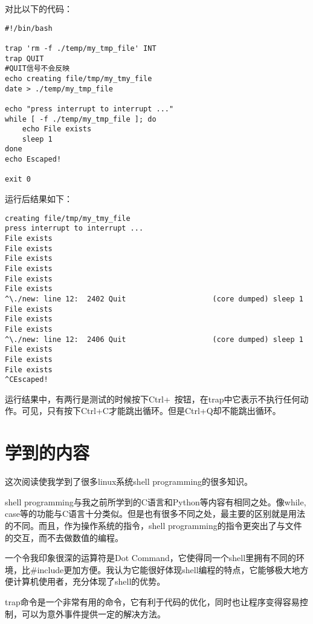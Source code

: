 \documentclass{ctexart}
\begin{document}
对比以下的代码：
\begin{verbatim}
#!/bin/bash

trap 'rm -f ./temp/my_tmp_file' INT
trap QUIT
#QUIT信号不会反映
echo creating file/tmp/my_tmy_file
date > ./temp/my_tmp_file

echo "press interrupt to interrupt ..."
while [ -f ./temp/my_tmp_file ]; do
    echo File exists
    sleep 1
done
echo Escaped!

exit 0
\end{verbatim}
运行后结果如下：
\begin{verbatim}
creating file/tmp/my_tmy_file
press interrupt to interrupt ...
File exists
File exists
File exists
File exists
File exists
File exists
^\./new: line 12:  2402 Quit                    (core dumped) sleep 1
File exists
File exists
File exists
^\./new: line 12:  2406 Quit                    (core dumped) sleep 1
File exists
File exists
File exists
^CEscaped!
\end{verbatim}
运行结果中，有两行是测试的时候按下Ctrl+\ 按钮，在trap中它表示不执行任何动作。可见，只有按下Ctrl+C才能跳出循环。但是Ctrl+Q却不能跳出循环。

\section{学到的内容}
这次阅读使我学到了很多linux系统shell programming的很多知识。

shell programming与我之前所学到的C语言和Python等内容有相同之处。像while, case等的功能与C语言十分类似。但是也有很多不同之处，最主要的区别就是用法的不同。而且，作为操作系统的指令，shell programming的指令更突出了与文件的交互，而不去做数值的编程。

一个令我印象很深的运算符是Dot Command，它使得同一个shell里拥有不同的环境，比$\#{}$include更加方便。我认为它能很好体现shell编程的特点，它能够极大地方便计算机使用者，充分体现了shell的优势。

trap命令是一个非常有用的命令，它有利于代码的优化，同时也让程序变得容易控制，可以为意外事件提供一定的解决方法。
\end{document}
